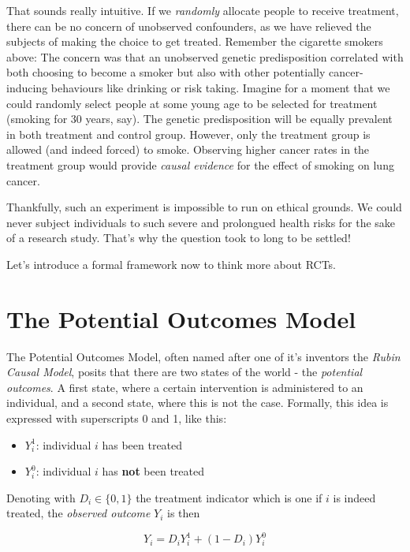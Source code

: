 \documentclass[]{book}
\providecommand{\tightlist}{%
  \setlength{\itemsep}{0pt}\setlength{\parskip}{0pt}}
\begin{document}
 That sounds really intuitive. If we \emph{randomly} allocate people to
receive treatment, there can be no concern of unobserved confounders, as
we have relieved the subjects of making the choice to get treated.
Remember the cigarette smokers above: The concern was that an unobserved
genetic predisposition correlated with both choosing to become a smoker
but also with other potentially cancer-inducing behaviours like drinking
or risk taking. Imagine for a moment that we could randomly select
people at some young age to be selected for treatment (smoking for 30
years, say). The genetic predisposition will be equally prevalent in
both treatment and control group. However, only the treatment group is
allowed (and indeed forced) to smoke. Observing higher cancer rates in
the treatment group would provide \emph{causal evidence} for the effect
of smoking on lung cancer.

Thankfully, such an experiment is impossible to run on ethical grounds.
We could never subject individuals to such severe and prolongued health
risks for the sake of a research study. That's why the question took to
long to be settled!

Let's introduce a formal framework now to think more about RCTs.

\section{The Potential Outcomes Model}\label{rubin}

The Potential Outcomes Model, often named after one of it's inventors
the \emph{Rubin Causal Model}, posits that there are two states of the
world - the \emph{potential outcomes}. A first state, where a certain
intervention is administered to an individual, and a second state, where
this is not the case. Formally, this idea is expressed with superscripts
0 and 1, like this:

\begin{itemize}
\tightlist
\item
  \(Y_i^1\): individual \(i\) has been treated
\item
  \(Y_i^0\): individual \(i\) has \textbf{not} been treated
\end{itemize}

Denoting with \(D_i \in \{0,1\}\) the treatment indicator which is one
if \(i\) is indeed treated, the \emph{observed outcome} \(Y_i\) is then

\begin{equation}
Y_i = D_i Y_i^1 + (1-D_i)Y_i^0 \label{eq:rubin-model}
\end{equation}
\end{document}
